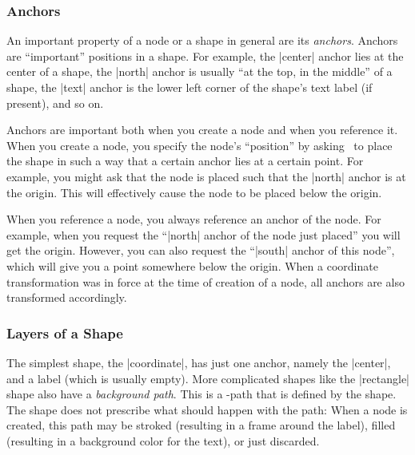 \subsubsection{Anchors}

An important property of a node or a shape in general are its \emph{anchors}.
Anchors are ``important'' positions in a shape. For example, the |center|
anchor lies at the center of a shape, the |north| anchor is usually ``at the
top, in the middle'' of a shape, the |text| anchor is the lower left corner of
the shape's text label (if present), and so on.

Anchors are important both when you create a node and when you reference it.
When you create a node, you specify the node's ``position'' by asking \pgfname\
to place the shape in such a way that a certain anchor lies at a certain point.
For example, you might ask that the node is placed such that the |north| anchor
is at the origin. This will effectively cause the node to be placed below the
origin.

When you reference a node, you always reference an anchor of the node. For
example, when you request the ``|north| anchor of the node just placed'' you
will get the origin. However, you can also request the ``|south| anchor of this
node'', which will give you a point somewhere below the origin. When a
coordinate transformation was in force at the time of creation of a node, all
anchors are also transformed accordingly.


\subsubsection{Layers of a Shape}

The simplest shape, the |coordinate|, has just one anchor, namely the |center|,
and a label (which is usually empty). More complicated shapes like the
|rectangle| shape also have a \emph{background path}. This is a \pgfname-path
that is defined by the shape. The shape does not prescribe what should happen
with the path: When a node is created, this path may be stroked (resulting in a
frame around the label), filled (resulting in a background color for the text),
or just discarded.

